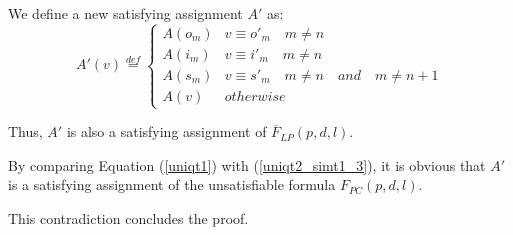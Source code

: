 \documentclass[journal]{IEEEtran}
\begin{document}
\begin{IEEEproof}
%
%
%
%
We define a new satisfying assignment $A'$ as:
\begin{equation}
A'(v) \overset{def}{=} \left\{ \begin{array}{ll}
A(o_m) & v\equiv o'_m\quad m\neq n \\
A(i_m) & v\equiv i'_m\quad m\neq n \\
A(s_m) & v\equiv s'_m\quad m\neq n\quad and\quad m\neq n+1 \\
A(v) & otherwise
\end{array}
\right.
\end{equation}

Thus,
$A'$ is also a satisfying assignment of $\overline{F}_{LP}(p,d,l)$.

By comparing Equation (\ref{uniqt1}) with (\ref{uniqt2_simt1_3}),
it is obvious that $A'$ is a satisfying assignment of the unsatisfiable formula ${F_{PC}(p,d,l)}$.

This contradiction concludes the proof.
\end{IEEEproof}
\end{document}
